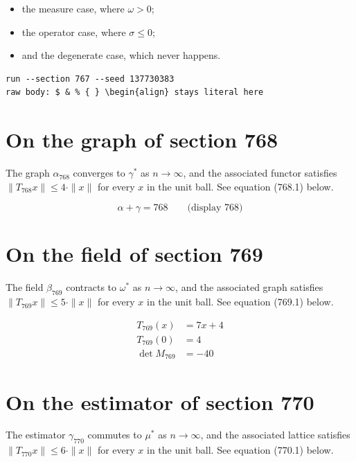 \documentclass{article}
\begin{document}
\begin{itemize}
  \item the measure case, where $\omega > 0$;
  \item the operator case, where $\sigma \leq 0$;
  \item and the degenerate case, which never happens.
\end{itemize}

\begin{verbatim}
run --section 767 --seed 137730383
raw body: $ & % { } \begin{align} stays literal here
\end{verbatim}

\section{On the graph of section 768}
The graph $\alpha_{768}$ converges to $\gamma^{*}$ as $n \to \infty$,
and the associated functor satisfies $\|T_{768} x\| \leq 4 \cdot \|x\|$
for every $x$ in the unit ball. See equation (768.1) below.

$$
\alpha + \gamma = 768 \qquad \text{(display 768)}
$$

\section{On the field of section 769}
The field $\beta_{769}$ contracts to $\omega^{*}$ as $n \to \infty$,
and the associated graph satisfies $\|T_{769} x\| \leq 5 \cdot \|x\|$
for every $x$ in the unit ball. See equation (769.1) below.

\begin{align}
T_{769}(x) &= 7 x + 4 \\
T_{769}(0) &= 4 \\
\det M_{769} &= -40
\end{align}

\section{On the estimator of section 770}
The estimator $\gamma_{770}$ commutes to $\mu^{*}$ as $n \to \infty$,
and the associated lattice satisfies $\|T_{770} x\| \leq 6 \cdot \|x\|$
for every $x$ in the unit ball. See equation (770.1) below.
\end{document}
